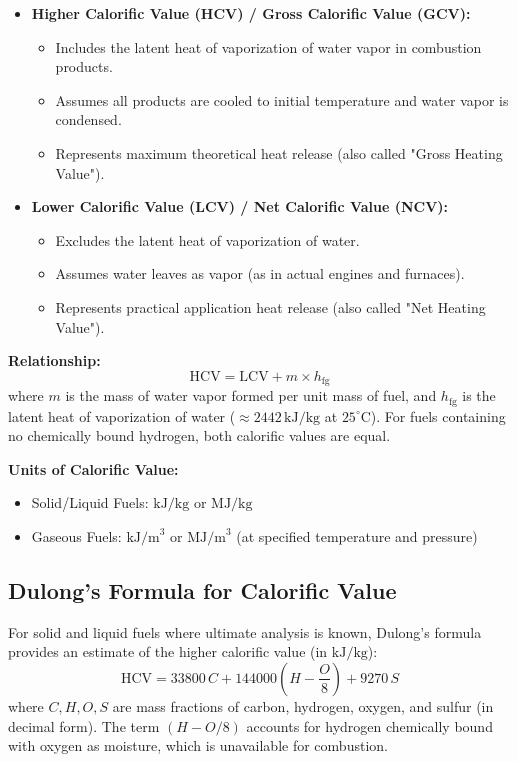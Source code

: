 \documentclass[12pt,a4paper]{article}
\begin{document}
\begin{itemize}
    \item \textbf{Higher Calorific Value (HCV) / Gross Calorific Value (GCV):}
    \begin{itemize}
        \item Includes the latent heat of vaporization of water vapor in combustion products.
        \item Assumes all products are cooled to initial temperature and water vapor is condensed.
        \item Represents maximum theoretical heat release (also called "Gross Heating Value").
    \end{itemize}
    \item \textbf{Lower Calorific Value (LCV) / Net Calorific Value (NCV):}
    \begin{itemize}
        \item Excludes the latent heat of vaporization of water.
        \item Assumes water leaves as vapor (as in actual engines and furnaces).
        \item Represents practical application heat release (also called "Net Heating Value").
    \end{itemize}
\end{itemize}

\textbf{Relationship:}
\[ \mathrm{HCV} = \mathrm{LCV} + m \times h_{\mathrm{fg}} \]
where $m$ is the mass of water vapor formed per unit mass of fuel, and $h_{\mathrm{fg}}$ is the latent heat of vaporization of water ($\approx 2442\,\text{kJ/kg}$ at $25^\circ\text{C}$). For fuels containing no chemically bound hydrogen, both calorific values are equal.

\textbf{Units of Calorific Value:}
\begin{itemize}
    \item Solid/Liquid Fuels: $\text{kJ/kg}$ or $\text{MJ/kg}$
    \item Gaseous Fuels: $\text{kJ/m}^3$ or $\text{MJ/m}^3$ (at specified temperature and pressure)
\end{itemize}

\subsection{Dulong's Formula for Calorific Value}
For solid and liquid fuels where ultimate analysis is known, Dulong's formula provides an estimate of the higher calorific value (in $\text{kJ/kg}$):
\[ \mathrm{HCV} = 33800\,C + 144000\left(H - \frac{O}{8}\right) + 9270\,S \]
where $C, H, O, S$ are mass fractions of carbon, hydrogen, oxygen, and sulfur (in decimal form). The term $(H - O/8)$ accounts for hydrogen chemically bound with oxygen as moisture, which is unavailable for combustion.
\end{document}
